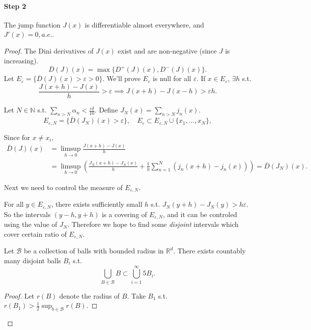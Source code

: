 \paragraph{Step 2}

\begin{proposition}
	The jump function $J(x)$ is differentiable almost everywhere, and $J'(x)=0, a.e.$.
\end{proposition}
\begin{proof}[Proof]
    The Dini derivatives of $J(x)$ exist and are non-negative (since $J$ is increasing).
	\[
	\overline{D}(J)(x) = \max\{D^+(J)(x), D^-(J)(x)\}.
	\]
	Let $E_\varepsilon = \{\overline{D}(J)(x) > \varepsilon > 0\}$.
	We'll prove $E_\varepsilon$ is null for all $\varepsilon$.
	If $x\in E_\varepsilon$,  $\exists h$ s.t.
	\[
		\frac{J(x+h) - J(x)}{h}>\varepsilon \implies J(x+h)-J(x-h) > \varepsilon h.
	\]

	Let $N\in \mathbb{N}$ s.t. $\sum_{n>N}\alpha_n < \frac{\varepsilon\delta}{10}$.
	Define $J_N(x) = \sum_{n>N} j_n(x)$.
	\[
	E_{\varepsilon, N} = \{\overline{D}(J_N)(x) > \varepsilon\},\quad
	E_\varepsilon \subset E_{\varepsilon, N}\cup \{x_1,\dots,x_N\},
	\]

	Since for $x\ne x_i$,
	\begin{align*}
		\overline{D}(J)(x) &= \limsup_{h\to 0} \frac{J(x+h)-J(x)}{h}\\
		&= \limsup_{h\to 0} \left( \frac{J_N(x+h)-J_N(x)}{h} + \frac{1}{h}
		\sum_{n=1}^{N} (j_n(x+h) - j_n(x))\right)
		= \overline{D}(J_N)(x).
	\end{align*}

	Next we need to control the measure of $E_{\varepsilon,N}$.

	For all $y\in E_{\varepsilon,N}$, there exists sufficiently
	small $h$ s.t. $J_N(y+h)-J_N(y)>h\varepsilon$.
	So the intervals $(y-h, y+h)$ is a covering of $E_{\varepsilon,N}$,
	and it can be controled using the value of $J_N$.
	Therefore we hope to find some \textit{disjoint} intervals which
	cover certain ratio of $E_{\varepsilon,N}$.

	\begin{lemma}
		Let $\mathcal{B}$ be a collection of balls with bounded radius in $\mathbb{R}^{d}$.
		There exists countably many disjoint balls $B_i$ s.t.
		\[
		\bigcup_{B\in \mathcal{B}} B \subset\bigcup_{i=1}^\infty 5B_i.
		\]
	\end{lemma}
	\begin{proof}[Proof]
		Let $r(B)$ denote the radius of $B$.
		Take $B_1$ s.t. $r(B_1)>\frac{1}{2} \sup_{b\in \mathcal{B}}r(B)$.


\end{proof}
\end{proof}
